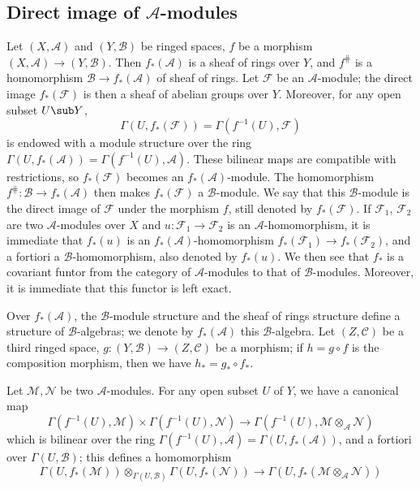 \subsection{Direct image of \texorpdfstring{$\mathscr{A}$}{A}-modules}
Let $(X,\mathscr{A})$ and $(Y,\mathscr{B})$ be ringed spaces, $f$ be a morphism $(X,\mathscr{A})\to(Y,\mathscr{B})$. Then $f_*(\mathscr{A})$ is a sheaf of rings over $Y$, and $f^{\hash}$ is a homomorphism $\mathscr{B}\to f_*(\mathscr{A})$ of sheaf of rings. Let $\mathscr{F}$ be an $\mathscr{A}$-module; the direct image $f_*(\mathscr{F})$ is then a sheaf of abelian groups over $Y$. Moreover, for any open subset $U\sub Y$,
\[\Gamma(U,f_*(\mathscr{F}))=\Gamma(f^{-1}(U),\mathscr{F})\]
is endowed with a module structure over the ring $\Gamma(U,f_*(\mathscr{A}))=\Gamma(f^{-1}(U),\mathscr{A})$. These bilinear maps are compatible with restrictions, so $f_*(\mathscr{F})$ becomes an $f_*(\mathscr{A})$-module. The homomorphism $f^{\hash}:\mathscr{B}\to f_*(\mathscr{A})$ then makes $f_*(\mathscr{F})$ a $\mathscr{B}$-module. We say that this $\mathscr{B}$-module is the direct image of $\mathscr{F}$ under the morphism $f$, still denoted by $f_*(\mathscr{F})$. If $\mathscr{F}_1$, $\mathscr{F}_2$ are two $\mathscr{A}$-modules over $X$ and $u:\mathscr{F}_1\to\mathscr{F}_2$ is an $\mathscr{A}$-homomorphism, it is immediate that $f_*(u)$ is an $f_*(\mathscr{A})$-homomorphism $f_*(\mathscr{F}_1)\to f_*(\mathscr{F}_2)$, and a fortiori a $\mathscr{B}$-homomorphism, also denoted by $f_*(u)$. We then see that $f_*$ is a covariant funtor from the category of $\mathscr{A}$-modules to that of $\mathscr{B}$-modules. Moreover, it is immediate that this functor is left exact.\par
Over $f_*(\mathscr{A})$, the $\mathscr{B}$-module structure and the sheaf of rings structure define a structure of $\mathscr{B}$-algebras; we denote by $f_*(\mathscr{A})$ this $\mathscr{B}$-algebra. Let $(Z,\mathscr{C})$ be a third ringed space, $g:(Y,\mathscr{B})\to(Z,\mathscr{C})$ be a morphism; if $h=g\circ f$ is the composition morphism, then we have $h_*=g_*\circ f_*$.\par
Let $\mathscr{M},\mathscr{N}$ be two $\mathscr{A}$-modules. For any open subset $U$ of $Y$, we have a canonical map
\[\Gamma(f^{-1}(U),\mathscr{M})\times\Gamma(f^{-1}(U),\mathscr{N})\to\Gamma(f^{-1}(U),\mathscr{M}\otimes_{\mathscr{A}}\mathscr{N})\]
which is bilinear over the ring $\Gamma(f^{-1}(U),\mathscr{A})=\Gamma(U,f_*(\mathscr{A}))$, and a fortiori over $\Gamma(U,\mathscr{B})$; this defines a homomorphism
\[\Gamma(U,f_*(\mathscr{M}))\otimes_{\Gamma(U,\mathscr{B})}\Gamma(U,f_*(\mathscr{N}))\to\Gamma(U,f_*(\mathscr{M}\otimes_{\mathscr{A}}\mathscr{N}))\]
